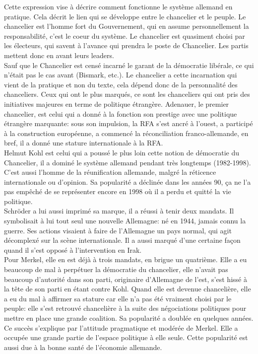 \documentclass[10pt, a4paper, openany]{book}
\begin{document}
Cette expression vise à décrire comment fonctionne le système allemand en pratique. Cela décrit le lien qui se développe entre le chancelier et le peuple. Le chancelier est l'homme fort du Gouvernement, qui en assume personnellement la responsabilité, c'est le coeur du système. Le chancelier est quasiment choisi par les électeurs, qui savent à l'avance qui prendra le poste de Chancelier. Les partis mettent donc en avant leurs leaders. \\
Sauf que le Chancelier est censé incarné le garant de la démocratie libérale, ce qui n'était pas le cas avant (Bismark, etc.). Le chancelier a cette incarnation qui vient de la pratique et non du texte, cela dépend donc de la personnalité des chanceliers. Ceux qui ont le plus marqués, ce sont les chanceliers qui ont pris des initiatives majeures en terme de politique étrangère. Adenauer, le premier chancelier, est celui qui a donné à la fonction son prestige avec une politique étrangère marquante: sous son impulsion, la RFA s'est ancré à l'ouest, a participé à la construction européenne, a commencé la réconciliation franco-allemande, en bref, il a donné une stature internationale à la RFA. \\
Helmut Kohl est celui qui a poussé le plus loin cette notion de démocratie du Chancelier, il a dominé le système allemand pendant très longtemps (1982-1998). C'est aussi l'homme de la réunification allemande, malgré la réticence internationale ou d'opinion. Sa popularité a déclinée dans les années 90, ça ne l'a pas empêché de se représenter encore en 1998 où il a perdu et quitté la vie politique. \\
Schröder a lui aussi imprimé sa marque, il a réussi à tenir deux mandats. Il symbolisait à lui tout seul une nouvelle Allemagne: né en 1944, jamais connu la guerre. Ses actions visaient à faire de l'Allemagne un pays normal, qui agit décomplexé sur la scène internationale. Il a aussi marqué d'une certaine façon quand il s'est opposé à l'intervention en Irak. \\
Pour Merkel, elle en est déjà à trois mandats, en brigue un quatrième. Elle a eu beaucoup de mal à perpétuer la démocratie du chancelier, elle n'avait pas beaucoup d'autorité dans son parti, originaire d'Allemagne de l'est, s'est hissé à la tête de son parti en étant contre Kohl. Quand elle est devenue chancelière, elle a eu du mal à affirmer sa stature car elle n'a pas été vraiment choisi par le peuple: elle s'est retrouvé chancelière à la suite des négociations politiques pour mettre en place une grande coalition. Sa popularité a doublée en quelques années. Ce succès s'explique par l'attitude pragmatique et modérée de Merkel. Elle a occupée une grande partie de l'espace politique à elle seule. Cette popularité est aussi due à la bonne santé de l'économie allemande. 
\end{document}
